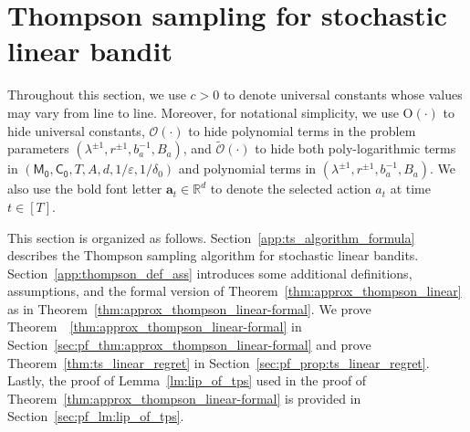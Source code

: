 \documentclass[10pt]{article}
\newcommand{\eps}{\varepsilon}
\renewcommand{\cO}{\mathcal{O}}
\newcommand{\<}{\left\langle}
\renewcommand{\>}{\right\rangle}
\newcommand{\R}{\mathbb{R}}
\newcommand{\Tpsparn}{{r}}
\newcommand{\tcO}{{\tilde{\mathcal O}}}
\newcommand{\action}{{a}}
\newcommand{\totlen}{{T}}
\newcommand{\conO}{{\mathrm{O}}}
\newcommand{\neuron}{{\mathsf{M_0}}}
\newcommand{\weightn}{{{\mathsf{C_0}}}}
\def\ba{{\mathbf a}}
\begin{document}
\section{Thompson sampling for stochastic linear bandit}\label{example:ts-app}

Throughout this section, we use $c>0$ to denote universal constants whose values may vary from line to line.
Moreover, for notational simplicity, we use $\conO(\cdot)$ to hide universal constants, $\cO(\cdot)$ to hide polynomial terms in the problem parameters  $(\lambda^{\pm1},\Tpsparn^{\pm1},b_a^{-1},B_a)$, and $\tcO(\cdot)$ to hide both poly-logarithmic terms in $(\neuron,\weightn,T,A,d,1/\eps,1/\delta_0)$ and polynomial terms in $(\lambda^{\pm1},\Tpsparn^{\pm1},b_a^{-1},B_a)$. We also use the bold font letter $\ba_t\in\R^d$ to denote the selected action $\action_t$ at time $t\in[\totlen]$.



This section is organized as follows. Section~\ref{app:ts_algorithm_formula} describes the Thompson sampling algorithm for stochastic linear bandits. Section~\ref{app:thompson_def_ass} introduces some additional definitions, assumptions, and the formal version of Theorem~\ref{thm:approx_thompson_linear} as in Theorem~\ref{thm:approx_thompson_linear-formal}.
We prove Theorem~~\ref{thm:approx_thompson_linear-formal} in Section~\ref{sec:pf_thm:approx_thompson_linear-formal} and prove Theorem~\ref{thm:ts_linear_regret} in Section~\ref{sec:pf_prop:ts_linear_regret}. Lastly, the proof of Lemma~\ref{lm:lip_of_tps} used in the proof of Theorem~\ref{thm:approx_thompson_linear-formal} is provided in Section~\ref{sec:pf_lm:lip_of_tps}.
\end{document}
